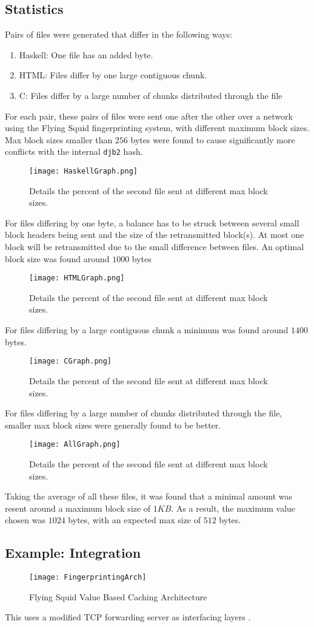 \subsection {Statistics}

Pairs of files were generated that differ in the following ways:

\begin{enumerate}
\item Haskell: One file has an added byte.
\item HTML: Files differ by one large contiguous chunk.
\item C: Files differ by a large number of chunks distributed through the file
\end{enumerate}

For each pair, these pairs of files were sent one after the other over a network using the Flying Squid fingerprinting system, with different maximum block sizes. Max block sizes 	smaller than $256$ bytes were found to cause significantly more conflicts with the internal \verb|djb2| hash. 


\begin{figure}[H] \centering
\texttt{[image: HaskellGraph.png]}
\caption{Details the percent of the second file sent at different max block sizes.}
\end{figure}
\noindent
For files differing by one byte, a balance has to be struck between several small block headers being sent and the size of the retransmitted block(s). At most one block will be retransmitted due to the small difference between files. An optimal block size was found around $1000$ bytes

\begin{figure}[H] \centering
\texttt{[image: HTMLGraph.png]}
\caption{Details the percent of the second file sent at different max block sizes.}
\end{figure}
\noindent
For files differing by a large contiguous chunk a minimum was found around $1400$ bytes.

\begin{figure}[H] \centering
\texttt{[image: CGraph.png]}
\caption{Details the percent of the second file sent at different max block sizes.}
\end{figure}
\noindent
For files differing by a large number of chunks distributed through the file, smaller max block sizes were generally found to be better.


\begin{figure}[H] \centering
\texttt{[image: AllGraph.png]}
\caption{Details the percent of the second file sent at different max block sizes.}
\end{figure}
\noindent
Taking the average of all these files, it was found that a minimal amount was resent around a maximum block size of $1 KB$. As a result, the maximum value chosen was $1024$ bytes, with an expected max size of $512$ bytes.

\subsection{Example: Integration}

\begin{figure}[H] \centering
\texttt{[image: FingerprintingArch]}
\caption{Flying Squid Value Based Caching Architecture}
\end{figure}

This uses a modified TCP forwarding server as interfacing layers \cite{Partow}.
